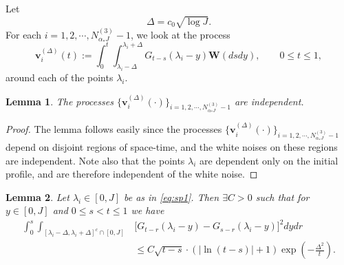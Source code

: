 \documentclass[12pt]{amsart}
\numberwithin{equation}{section}
\newtheorem{lem}{Lemma}[section]
\theoremstyle{definition}
\numberwithin{equation}{section}
\newcommand{\W}{\mathbf W}
\newcommand{\vv}{\mathbf v}
\begin{document}
Let 
\[ \Delta = c_0\sqrt{\log J}.\]
For each $i=1,2,\cdots,  N^{(3)}_{\alpha_*J}-1$, we look at the process 
\begin{equation} \label{eq:v}  \vv_i^{(\Delta)}(t):= \int_0^t\int_{\lambda_i- \Delta}^{\lambda_i+\Delta} G_{t-s}(\lambda_i-y) \W(ds dy), \qquad 0\le t\le 1,\end{equation}
around each of the points $\lambda_i$.
\begin{lem} The processes $\{\vv_i^{(\Delta)}(\cdot)\}_{i=1,2,\cdots,  N^{(3)}_{\alpha_*J}-1}$ are independent. 
\end{lem} 
\begin{proof} The lemma follows easily since the processes 
$\{\vv_i^{(\Delta)}(\cdot)\}_{i=1,2,\cdots,  N^{(3)}_{\alpha_*J}-1}$ 
depend on disjoint regions of space-time, and the white noises on these 
regions are independent. Note also that the points $\lambda_i$ are 
dependent only on the initial profile, and are therefore independent of 
the white noise. \end{proof}


\begin{lem} \label{lem:secterm}
 Let $\lambda_i \in [0,J]$  be as in \eqref{eq:sp1}.  
Then $\exists C >0$ such that for $y \in [0,J]$ 
and $0\leq s < t\leq 1$ we have 
\begin{align*}
\int_{0}^{s}\int_{[\lambda_i-\Delta,\lambda_i+\Delta]^c\cap[0,J]}
  &\Big[ G_{t-r}(\lambda_i-y)-G_{s-r}(\lambda_i-y) \Big]^2dydr  \\
&\leq C\sqrt{t-s}\cdot\left(\big|\ln(t-s)\big|+1\right)
      \exp\left(-\frac{\Delta^2}{t}\right).  
\end{align*}
\end{lem}
\end{document}
